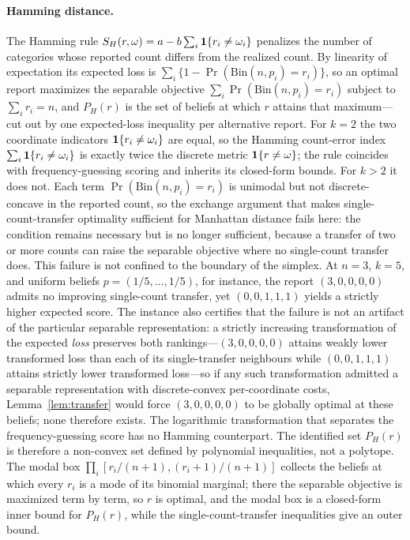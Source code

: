 \paragraph{Hamming distance.}
The Hamming rule \(S_H(r,\omega)=a-b\sum_i\mathbf{1}\{r_i\ne\omega_i\}\) penalizes the number of categories whose reported count differs from the realized count.
By linearity of expectation its expected loss is \(\sum_i\{1-\Pr(\mathrm{Bin}(n,p_i)=r_i)\}\), so an optimal report maximizes the separable objective \(\sum_i\Pr(\mathrm{Bin}(n,p_i)=r_i)\) subject to \(\sum_i r_i=n\), and \(P_H(r)\) is the set of beliefs at which \(r\) attains that maximum---cut out by one expected-loss inequality per alternative report.
For \(k=2\) the two coordinate indicators \(\mathbf{1}\{r_i\ne\omega_i\}\) are equal, so the Hamming count-error index \(\sum_i\mathbf{1}\{r_i\ne\omega_i\}\) is exactly twice the discrete metric \(\mathbf{1}\{r\ne\omega\}\); the rule coincides with frequency-guessing scoring and inherits its closed-form bounds.
For \(k>2\) it does not.
Each term \(\Pr(\mathrm{Bin}(n,p_i)=r_i)\) is unimodal but not discrete-concave in the reported count, so the exchange argument that makes single-count-transfer optimality sufficient for Manhattan distance fails here: the condition remains necessary but is no longer sufficient, because a transfer of two or more counts can raise the separable objective where no single-count transfer does.
This failure is not confined to the boundary of the simplex.
At \(n=3\), \(k=5\), and uniform beliefs \(p=(1/5,\ldots,1/5)\), for instance, the report \((3,0,0,0,0)\) admits no improving single-count transfer, yet \((0,0,1,1,1)\) yields a strictly higher expected score.
The instance also certifies that the failure is not an artifact of the particular separable representation: a strictly increasing transformation of the expected \emph{loss} preserves both rankings---\((3,0,0,0,0)\) attains weakly lower transformed loss than each of its single-transfer neighbours while \((0,0,1,1,1)\) attains strictly lower transformed loss---so if any such transformation admitted a separable representation with discrete-convex per-coordinate costs, Lemma~\ref{lem:transfer} would force \((3,0,0,0,0)\) to be globally optimal at these beliefs; none therefore exists.
The logarithmic transformation that separates the frequency-guessing score has no Hamming counterpart.
The identified set \(P_H(r)\) is therefore a non-convex set defined by polynomial inequalities, not a polytope.
The modal box \(\prod_i[r_i/(n+1),(r_i+1)/(n+1)]\) collects the beliefs at which every \(r_i\) is a mode of its binomial marginal; there the separable objective is maximized term by term, so \(r\) is optimal, and the modal box is a closed-form inner bound for \(P_H(r)\), while the single-count-transfer inequalities give an outer bound.
